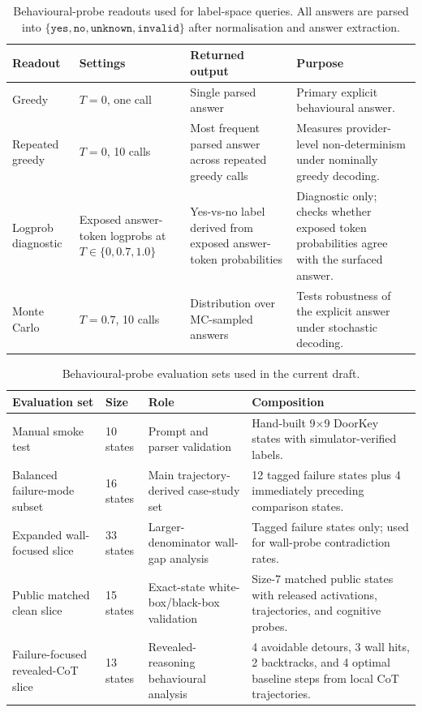 \documentclass[11pt,a4paper]{article}
\begin{document}
\begin{table}[h]
\centering
\small
\begin{tabular}{p{3.0cm} p{2.1cm} p{3.7cm} p{5.0cm}}
\toprule
Readout & Settings & Returned output & Purpose \\
\midrule
Greedy & $T=0$, one call & Single parsed answer & Primary explicit behavioural answer. \\
Repeated greedy & $T=0$, 10 calls & Most frequent parsed answer across repeated greedy calls & Measures provider-level non-determinism under nominally greedy decoding. \\
Logprob diagnostic & Exposed answer-token logprobs at $T \in \{0, 0.7, 1.0\}$ & Yes-vs-no label derived from exposed answer-token probabilities & Diagnostic only; checks whether exposed token probabilities agree with the surfaced answer. \\
Monte Carlo & $T=0.7$, 10 calls & Distribution over MC-sampled answers & Tests robustness of the explicit answer under stochastic decoding. \\
\bottomrule
\end{tabular}
\caption{Behavioural-probe readouts used for label-space queries. All answers are parsed into
$\{\texttt{yes}, \texttt{no}, \texttt{unknown}, \texttt{invalid}\}$ after normalisation and
answer extraction.}
\label{tab:bp-readouts}
\end{table}

\begin{table}[h]
\centering
\small
\begin{tabular}{p{3.3cm} p{1.4cm} p{4.3cm} p{5.0cm}}
\toprule
Evaluation set & Size & Role & Composition \\
\midrule
Manual smoke test & 10 states & Prompt and parser validation & Hand-built 9$\times$9 DoorKey states with simulator-verified labels. \\
Balanced failure-mode subset & 16 states & Main trajectory-derived case-study set & 12 tagged failure states plus 4 immediately preceding comparison states. \\
Expanded wall-focused slice & 33 states & Larger-denominator wall-gap analysis & Tagged failure states only; used for wall-probe contradiction rates. \\
Public matched clean slice & 15 states & Exact-state white-box/black-box validation & Size-7 matched public states with released activations, trajectories, and cognitive probes. \\
Failure-focused revealed-CoT slice & 13 states & Revealed-reasoning behavioural analysis & 4 avoidable detours, 3 wall hits, 2 backtracks, and 4 optimal baseline steps from local CoT trajectories. \\
\bottomrule
\end{tabular}
\caption{Behavioural-probe evaluation sets used in the current draft.}
\label{tab:bp-datasets}
\end{table}
\end{document}
